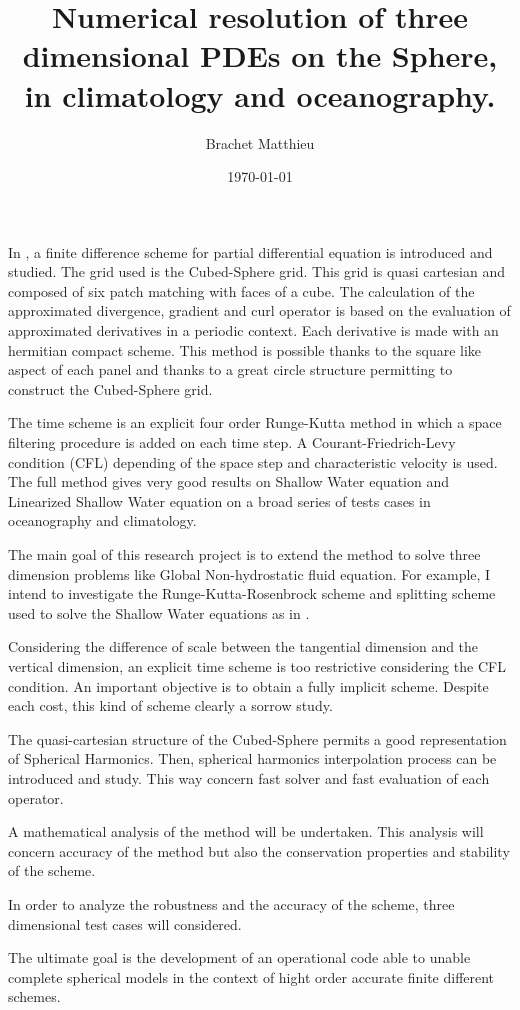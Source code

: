 \documentclass[10pt,a4paper]{amsart}
\author{Brachet Matthieu}
\title{Numerical resolution of three dimensional PDEs on the Sphere, in climatology and oceanography.}
\date\today
\begin{document}
\maketitle

In \cite{Croisille-10, Croisille-12, Brachet-Croisille}, a finite difference scheme for partial differential equation is introduced and studied. The grid used is the Cubed-Sphere grid. This grid is quasi cartesian and composed of six patch matching with faces of a cube.
The calculation of the approximated divergence, gradient and curl operator is based on the evaluation of approximated derivatives in a periodic context. Each derivative is made with an hermitian compact scheme. This method is possible thanks to the square like aspect of each panel and thanks to a great circle structure permitting to construct the Cubed-Sphere grid.

The time scheme is an explicit four order Runge-Kutta method in which a space filtering procedure is added on each time step. A Courant-Friedrich-Levy condition (CFL) depending of the space step and characteristic velocity is used.
The full method gives very good results on Shallow Water equation and Linearized Shallow Water equation on a broad series of tests cases in oceanography and climatology.

The main goal of this research project is to extend the method to solve three dimension problems like Global Non-hydrostatic fluid equation. For example, I intend to investigate the Runge-Kutta-Rosenbrock scheme and splitting scheme used to solve the Shallow Water equations as in \cite{Ullrich, Choi-Hong}.

Considering the difference of scale between the tangential dimension and the vertical dimension, an explicit time scheme is too restrictive considering the CFL condition. An important objective is to obtain a fully implicit scheme. Despite each cost, this kind of scheme clearly a sorrow study. 

The quasi-cartesian structure of the Cubed-Sphere permits a good representation of Spherical Harmonics. Then, spherical harmonics interpolation process can be introduced and study. This way concern fast solver and fast evaluation of each operator.

A mathematical analysis of the method will be undertaken. This analysis will concern accuracy of the method but also the conservation properties and stability of the scheme. 

In order to analyze the robustness and the accuracy of the scheme, three dimensional test cases will considered. 

The ultimate goal is the development of an operational code able to unable complete spherical models in the context of hight order accurate finite different schemes.



\end{document}
